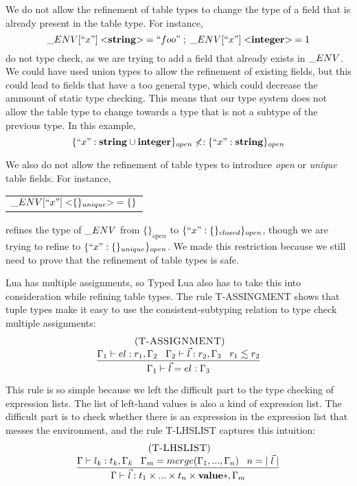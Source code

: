 We do not allow the refinement of table types to change the type of
a field that is already present in the table type.
For instance,
\[
\string_ENV[``x"] \; {<}\String{>} = ``foo" \;;\; \string_ENV[``x"] \; {<}\Integer{>} = 1
\]
do not type check, as we are trying to add a field that already exists
in $\string_ENV$.
We could have used union types to allow the refinement of existing fields,
but this could lead to fields that have a too general type, which could
decrease the ammount of static type checking.
This means that our type system does not allow the table type to change
towards a type that is not a subtype of the previous type.
In this example,
\[
\{``x":\mathbf{string} \cup \mathbf{integer}\}_{open} \not<: \{``x":\mathbf{string}\}_{open}
\]

We also do not allow the refinement of table types to introduce
\emph{open} or \emph{unique} table fields.
For instance,
\begin{center}
\begin{tabular}{l}
$\string_ENV[``x"] \; {<}\{\}_{unique}{>} = \{\}$
\end{tabular}
\end{center}
refines the type of $\string_ENV$ from $\{\}_{open}$ to $\{``x":\{\}_{closed}\}_{open}$,
though we are trying to refine to $\{``x":\{\}_{unique}\}_{open}$.
We made this restriction because we still need to prove that the refinement
of table types is safe.

Lua has multiple assignments, so Typed Lua also has to take this into
consideration while refining table types.
The rule \textsc{T-ASSINGMENT} shows that tuple types make it easy
to use the consistent-subtyping relation to type check multiple assignments:
\[
\begin{array}{c}
\; (\textsc{T-ASSIGNMENT})\\
\begin{array}{c}
\dfrac{\Gamma_{1} \vdash el:r_{1}, \Gamma_{2} \;\;\;
       \Gamma_{2} \vdash \vec{l}:r_{2}, \Gamma_{3} \;\;\;
       r_{1} \lesssim r_{2}}
      {\Gamma_{1} \vdash \vec{l} = el:\Gamma_{3}}
\end{array}
\end{array}
\]

This rule is so simple because we left the difficult part to the
type checking of expression lists.
The list of left-hand values is also a kind of expression list.
The difficult part is to check whether there is an expression in
the expression list that messes the environment, and the rule
\textsc{T-LHSLIST} captures this intuition:
\[
\begin{array}{c}
\; (\textsc{T-LHSLIST})\\
\dfrac{\Gamma \vdash l_{k}:t_{k}, \Gamma_{k} \;\;\;
       \Gamma_{m} = merge(\Gamma_{1}, ..., \Gamma_{n}) \;\;\;
       n = |\;\vec{l}\;|}
      {\Gamma \vdash \vec{l}:t_{1} \times ... \times t_{n} \times \mathbf{value}{*}, \Gamma_{m}}
\end{array}
\]

